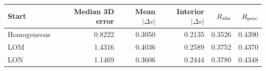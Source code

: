 \begin{tabular}{lrrrrr}\toprule Start & Median 3D error & Mean $|\Delta v|$ & Interior $|\Delta v|$ & $R_{\rm abs}$ & $R_{\rm prec}$\\\midrule
Homogeneous & 0.8222 & 0.3050 & 0.2135 & 0.3526 & 0.4390\\
LOM & 1.4316 & 0.4036 & 0.2589 & 0.3752 & 0.4370\\
LON & 1.1469 & 0.3606 & 0.2444 & 0.3780 & 0.4348\\
\bottomrule\end{tabular}
